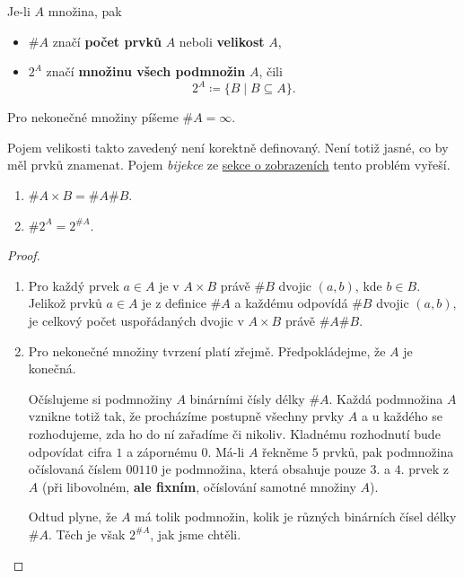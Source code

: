 \begin{definition}
 Je-li $A$ množina, pak
 \begin{itemize}
  \item $\#A$ značí \textbf{počet prvků} $A$ neboli \textbf{velikost} $A$,
  \item $2^{A}$ značí \textbf{množinu všech podmnožin} $A$, čili
   \[
    2^{A} \coloneqq \{B \mid B \subseteq A\}.
   \]
 \end{itemize}
 Pro nekonečné množiny píšeme $\#A = \infty$.
\end{definition}

\begin{warning}
 Pojem velikosti takto zavedený není korektně definovaný. Není totiž jasné, co
 by měl  prvků znamenat. Pojem \emph{bijekce} ze
 \hyperref[ssec:zobrazeni] {sekce o zobrazeních} tento problém vyřeší.
\end{warning}

\begin{claim}
 \hfill
 \vspace*{-.5\parskip}
 \begin{enumerate}
  \item $\#A \times B = \#A\#B$.
  \item $\#2^{A} = 2^{\# A}$.
 \end{enumerate}
\end{claim}
\begin{proof}
 \hfill
 \vspace*{-.5\parskip}
 \begin{enumerate}
  \item Pro každý prvek $a \in A$ je v $A \times B$ právě $\# B$ dvojic $(a,b)$,
   kde $b \in B$. Jelikož prvků $a \in A$ je z definice $\# A$ a každému
   odpovídá $\# B$ dvojic $(a,b)$, je celkový počet uspořádaných dvojic v $A
   \times B$ právě $\# A \# B$.
  \item Pro nekonečné množiny tvrzení platí zřejmě. Předpokládejme, že $A$ je
   konečná.
   
   Očíslujeme si podmnožiny $A$ binárními čísly délky $\# A$. Každá podmnožina
   $A$ vznikne totiž tak, že procházíme postupně všech\-ny prvky $A$ a u každého
   se rozhodujeme, zda ho do ní zařadíme či nikoliv. Kladnému rozhodnutí bude
   odpovídat cifra $1$ a zápornému $0$. Má-li $A$ řekněme $5$ prvků, pak
   podmnožina očíslovaná číslem $00110$ je podmnožina, která obsahuje pouze $3.$
   a $4.$ prvek z $A$ (při libovolném, \textbf{ale fixním}, očíslování samotné
   množiny $A$).

   Odtud plyne, že $A$ má tolik podmnožin, kolik je různých binárních čísel
   délky $\# A$. Těch je však $2^{\# A}$, jak jsme chtěli.\qedhere
 \end{enumerate}
\end{proof}
